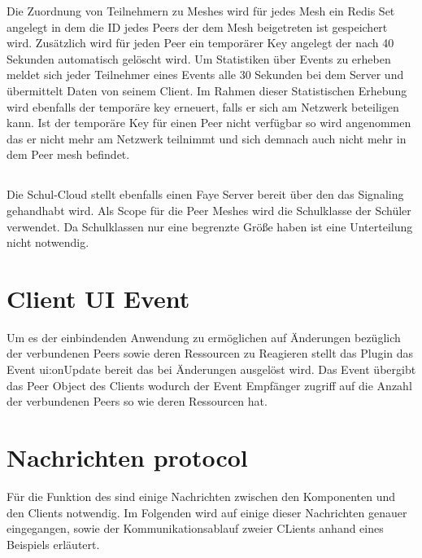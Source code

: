 \begin{description}
Die Zuordnung von Teilnehmern zu Meshes wird für jedes Mesh ein Redis Set angelegt in dem die ID jedes Peers der dem Mesh beigetreten ist gespeichert wird. Zusätzlich wird für jeden Peer ein temporärer Key angelegt der nach 40 Sekunden automatisch gelöscht wird. Um Statistiken über Events zu erheben meldet sich jeder Teilnehmer eines Events alle 30 Sekunden bei dem Server und übermittelt Daten von seinem Client. Im Rahmen dieser Statistischen Erhebung wird ebenfalls der temporäre key erneuert, falls er sich am \pTp Netzwerk beteiligen kann. Ist der temporäre Key für einen Peer nicht verfügbar so wird angenommen das er nicht mehr am \pTp Netzwerk teilnimmt und sich demnach auch nicht mehr in dem Peer mesh befindet.     

\subsection{\schulCloud}

Die Schul-Cloud stellt ebenfalls einen Faye Server bereit über den das Signaling gehandhabt wird. Als Scope für die Peer Meshes wird die Schulklasse der Schüler verwendet. Da Schulklassen nur eine begrenzte Größe haben ist eine Unterteilung nicht notwendig.


\section{Client UI Event}
Um es der einbindenden Anwendung zu ermöglichen auf Änderungen bezüglich der verbundenen Peers sowie deren Ressourcen zu Reagieren stellt das Plugin das Event ui:onUpdate bereit das bei Änderungen ausgelöst wird. Das Event übergibt das Peer Object des Clients wodurch der Event Empfänger zugriff auf die Anzahl der verbundenen Peers so wie deren Ressourcen hat. 

\section{Nachrichten protocol}

Für die Funktion des \cdns sind einige Nachrichten zwischen den Komponenten und den Clients notwendig. Im Folgenden wird auf einige dieser Nachrichten genauer eingegangen, sowie der Kommunikationsablauf zweier CLients anhand eines Beispiels erläutert.


\end{description}
